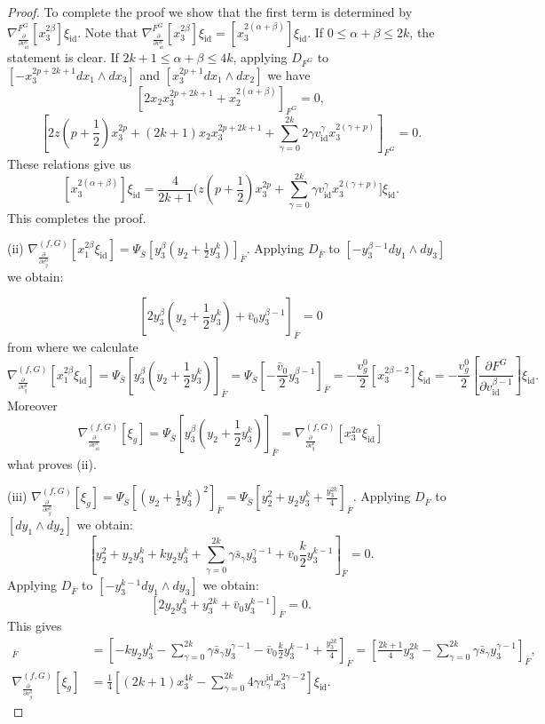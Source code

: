 \documentclass[reqno,12pt]{amsart}
\numberwithin{equation}{section}
\theoremstyle{plain}
\theoremstyle{definition}
\newcommand{\id}{\mathrm{id}}
\numberwithin{equation}{section}
\begin{document}
\begin{proof}
To complete the proof we show that the first term is determined by $\nabla^{F^G}_{\frac{\partial}{\partial v^\alpha_{\id}}}[x_3^{2\beta}]\xi_{\id}$. Note that $\nabla^{F^G}_{\frac{\partial}{\partial v^\alpha_{\id}}}[x_3^{2\beta}]\xi_{\id} = [x_3^{2(\alpha+\beta)}]\xi_{\id}$. If $0 \le \alpha + \beta \le 2k$, the statement is clear. If $2k+1 \le \alpha + \beta \le 4k$, applying $D_{F^G}$ to $[-x_3^{2p+2k+1} dx_1 \wedge d x_3]$ and $[x_3^{2p+1}dx_1 \wedge dx_2]$ we have
\[
[2x_2x_3^{2p+2k+1} + x_2^{2(\alpha+\beta)}]_{F^G} = 0,
\]
\[
[2z (p+\frac{1}{2})x_3^{2p} + (2k+1)x_2x_3^{2p+2k+1} + \sum_{\gamma=0}^{2k}2\gamma v^{\gamma}_{\id} x_3^{2(\gamma+p)}]_{F^G} = 0.
\]
These relations give us
\[
[x_3^{2(\alpha+\beta)}]\xi_{\id} = \frac{4}{2k+1}(z (p+\frac{1}{2})x_3^{2p} + \sum_{\gamma=0}^{2k}\gamma v^{\gamma}_{\id} x_3^{2(\gamma+p)}]\xi_{\id}.
\]
This completes the proof.

(ii) $\nabla_{\frac{\partial}{\partial v^0_{g}}}^{(f,G)}[x_1^{2\beta}\xi_{\id}] = \Psi_{\bar{S}}[y_3^{\beta}(y_2+\frac{1}{2}y_3^k)] _{\bar{F}}$. Applying $D_{\bar{F}}$ to $[-y_3^{\beta-1}dy_1\wedge dy_3]$ we obtain:

\[
[2y_3^\beta(y_2+\frac{1}{2}y_3^k)+ \bar{v}_0y_3^{\beta-1}] _{\bar{F}}= 0
\]
from where we calculate
\[
\nabla_{\frac{\partial}{\partial v^0_{g}}}^{(f,G)}[x_1^{2\beta}\xi_{\id}] = \Psi_{\bar{S}}[y_3^{\beta}(y_2+\frac{1}{2}y_3^k)] _{\bar{F}} = \Psi_{\bar{S}}[-\frac{\bar{v}_0}{2}y_3^{\beta-1}] _{\bar{F}}= - \frac{v_g^0}{2}[x_3^{2\beta-2}]\xi_{\id} =  - \frac{v_g^0}{2}\left[\frac{\partial F^G}{\partial v^{\beta-1}_{\id}}\right]\xi_{\id}.
\]
Moreover
\[ 
\nabla_{\frac{\partial}{\partial v^\alpha_{\id}}}^{(f,G)}[\xi_g] = \Psi_{\bar{S}}[y_3^{\beta}(y_2+\frac{1}{2}y_3^k)] _{\bar{F}} = 
\nabla_{\frac{\partial}{\partial v^0_{g}}}^{(f,G)}[x_3^{2\alpha}\xi_{\id}] 
\]
what proves (ii).


(iii) $\nabla_{\frac{\partial}{\partial v^0_{g}}}^{(f,G)}[\xi_{g}] = \Psi_{\bar{S}}[(y_2+\frac{1}{2}y_3^k)^2]_{\bar{F}} = \Psi_{\bar{S}}[y_2^2+ y_2y_3^k + \frac{y_3^{2k}}{4}]_{\bar{F}}$. 
Applying $D_{\bar{F}}$ to $[dy_1\wedge dy_2]$ we obtain:
\[
[y_2^2 + y_2y_3^k + ky_2y_3^k+ \sum_{\gamma = 0}^{2k} \gamma \bar{s}_{\gamma} y_3^{\gamma-1} + \bar v_0\frac{k}{2}y_3^{k-1}]_{\bar{F}} = 0.
\]
Applying $D_{\bar{F}}$ to $[-y_3^{k-1}dy_1\wedge dy_3]$ we obtain:
\[
    [2y_2y_3^k + y_3^{2k} + \bar v_0y_3^{k-1}]_{\bar{F}} = 0.
\]
This gives
\begin{align*}
 [(y_2+\frac{1}{2}y_3^k)^2]_{\bar{F}} &= [-ky_2y_3^k - \sum_{\gamma = 0}^{2k} \gamma \bar{s}_{\gamma} y_3^{\gamma-1} - \bar v_0\frac{k}{2}y_3^{k-1} + \frac{y_3^{2k}}{4}]_{\bar{F}}
 = [ \frac{2k+1}{4} y_3^{2k} - \sum_{\gamma = 0}^{2k} \gamma \bar{s}_{\gamma} y_3^{\gamma-1}]_{\bar{F}}, 
 \\
\nabla_{\frac{\partial}{\partial v^0_{g}}}^{(f,G)}[\xi_{g}] 
    &= \frac{1}{4}[(2k+1)x_3^{4k} - \sum_{\gamma=0}^{2k} 4\gamma v_{\gamma}^{\id} x_3^{2\gamma-2}]\xi_{\id}.
\end{align*}


\end{proof}
\end{document}
